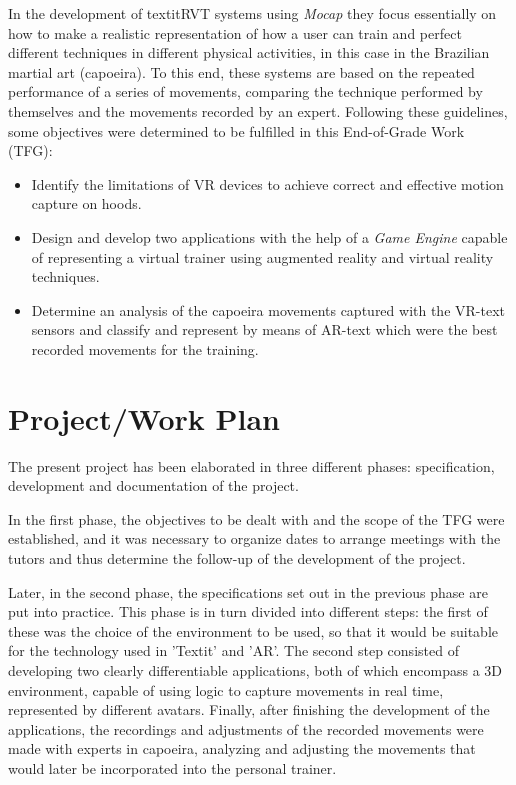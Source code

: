 In the development of textit{RVT} systems using \textit{Mocap} they focus essentially on how to make a realistic representation of how a user can train and perfect different techniques in different physical activities, in this case in the Brazilian martial art (capoeira). To this end, these systems are based on the repeated performance of a series of movements, comparing the technique performed by themselves and the movements recorded by an expert. Following these guidelines, some objectives were determined to be fulfilled in this End-of-Grade Work (TFG):

\begin{itemize}
    \item Identify the limitations of VR devices to achieve correct and effective motion capture on hoods.
    \item Design and develop two applications with the help of a \textit{Game Engine} capable of representing a virtual trainer using augmented reality and virtual reality techniques.
    \item Determine an analysis of the capoeira movements captured with the VR-text sensors and classify and represent by means of AR-text which were the best recorded movements for the training.
\end{itemize}


\section{Project/Work Plan}

The present project has been elaborated in three different phases: specification, development and documentation of the project.

In the first phase, the objectives to be dealt with and the scope of the TFG were established, and it was necessary to organize dates to arrange meetings with the tutors and thus determine the follow-up of the development of the project.

Later, in the second phase, the specifications set out in the previous phase are put into practice. This phase is in turn divided into different steps: the first of these was the choice of the environment to be used, so that it would be suitable for the technology used in 'Textit' and 'AR'. The second step consisted of developing two clearly differentiable applications, both of which encompass a 3D environment, capable of using logic to capture movements in real time, represented by different avatars. Finally, after finishing the development of the applications, the recordings and adjustments of the recorded movements were made with experts in capoeira, analyzing and adjusting the movements that would later be incorporated into the personal trainer.

